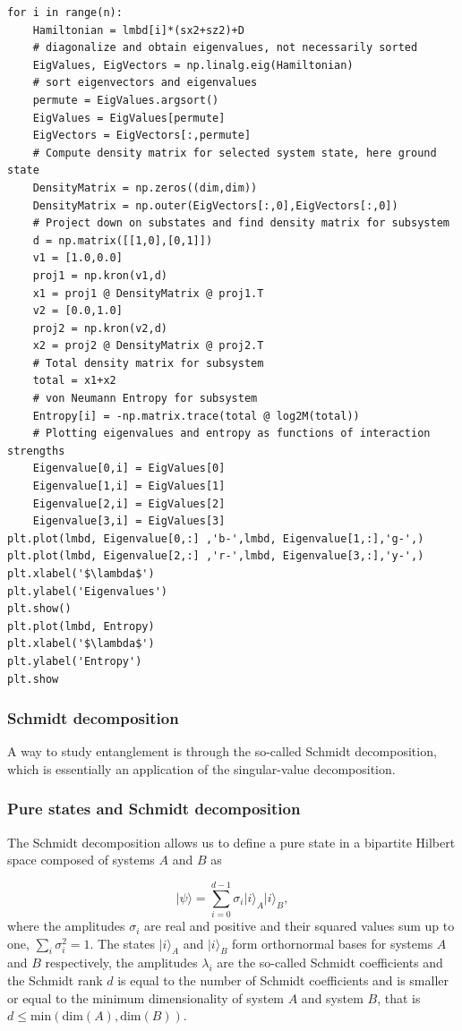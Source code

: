 \documentclass{beamer}
\begin{document}
\begin{frame}
\begin{verbatim}
for i in range(n): 
    Hamiltonian = lmbd[i]*(sx2+sz2)+D
    # diagonalize and obtain eigenvalues, not necessarily sorted
    EigValues, EigVectors = np.linalg.eig(Hamiltonian)
    # sort eigenvectors and eigenvalues
    permute = EigValues.argsort()
    EigValues = EigValues[permute]
    EigVectors = EigVectors[:,permute]
    # Compute density matrix for selected system state, here ground state
    DensityMatrix = np.zeros((dim,dim))
    DensityMatrix = np.outer(EigVectors[:,0],EigVectors[:,0])
    # Project down on substates and find density matrix for subsystem
    d = np.matrix([[1,0],[0,1]])
    v1 = [1.0,0.0]
    proj1 = np.kron(v1,d)
    x1 = proj1 @ DensityMatrix @ proj1.T
    v2 = [0.0,1.0]
    proj2 = np.kron(v2,d)
    x2 = proj2 @ DensityMatrix @ proj2.T
    # Total density matrix for subsystem
    total = x1+x2
    # von Neumann Entropy for subsystem 
    Entropy[i] = -np.matrix.trace(total @ log2M(total))
    # Plotting eigenvalues and entropy as functions of interaction strengths
    Eigenvalue[0,i] = EigValues[0]
    Eigenvalue[1,i] = EigValues[1]
    Eigenvalue[2,i] = EigValues[2]
    Eigenvalue[3,i] = EigValues[3]
plt.plot(lmbd, Eigenvalue[0,:] ,'b-',lmbd, Eigenvalue[1,:],'g-',)
plt.plot(lmbd, Eigenvalue[2,:] ,'r-',lmbd, Eigenvalue[3,:],'y-',)
plt.xlabel('$\lambda$')
plt.ylabel('Eigenvalues')
plt.show()
plt.plot(lmbd, Entropy)
plt.xlabel('$\lambda$')
plt.ylabel('Entropy')          
plt.show

\end{verbatim}
\end{frame}

\begin{frame}
\frametitle{Schmidt decomposition}

A way to study entanglement is through the so-called Schmidt decomposition,
which is essentially an application of the
singular-value decomposition.
\end{frame}

\begin{frame}
\frametitle{Pure states and Schmidt decomposition}

The Schmidt decomposition allows us to define a pure state in a
bipartite Hilbert space composed of systems $A$ and $B$ as

\[
\vert\psi\rangle=\sum_{i=0}^{d-1}\sigma_i\vert i\rangle_A\vert i\rangle_B,
\]
where the amplitudes $\sigma_i$ are real and positive and their
squared values sum up to one, $\sum_i\sigma_i^2=1$. The states $\vert
i\rangle_A$ and $\vert i\rangle_B$ form orthornormal bases for systems
$A$ and $B$ respectively, the amplitudes $\lambda_i$ are the so-called
Schmidt coefficients and the Schmidt rank $d$ is equal to the number
of Schmidt coefficients and is smaller or equal to the minimum
dimensionality of system $A$ and system $B$, that is $d\leq
\mathrm{min}(\mathrm{dim}(A), \mathrm{dim}(B))$.
\end{frame}
\end{document}
